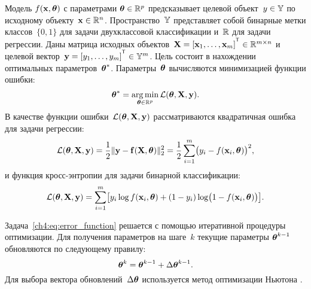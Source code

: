 \documentclass[11pt, a5paper]{dissert}
\begin{document}
Модель $f( \mathbf{x}, \boldsymbol{\theta})$ с параметрами $\boldsymbol{\theta} \in \mathbb{R}^p$ предсказывает целевой объект~$y \in \mathbb{Y}$ по исходному объекту~$\mathbf{x} \in \mathbb{R}^{n}$. Пространство~$\mathbb{Y}$ представляет собой бинарные метки классов~$\{0, 1\}$ для задачи двухклассовой классификации и~$\mathbb{R}$ для задачи регрессии.
Даны матрица исходных объектов~$\bX = [\bx_1, \dots, \bx_m]^{\T} \in \bbR^{m \times n}$ и целевой вектор~$\by = [y_1, \dots, y_m]^{\T} \in \bbY^{m}$. 
Цель состоит в нахождении оптимальных параметров~$\boldsymbol{\theta}^*$.
Параметры~$\boldsymbol{\theta}$ вычисляются минимизацией функции ошибки:
\begin{equation}
	\boldsymbol{\theta}^* = \mathop{\arg \min}\limits_{\boldsymbol{\theta} \in \mathbb{R}^p} \mathcal{L}(\boldsymbol{\theta}, \mathbf{X}, \mathbf{y}).
	\label{ch4:eq:error_function}
\end{equation}
В качестве функции ошибки~$\mathcal{L} (\boldsymbol{\theta}, \mathbf{X}, \mathbf{y})$ рассматриваются квадратичная ошибка для задачи регрессии:
\begin{equation}
	\mathcal{L}(\boldsymbol{\theta}, \mathbf{X}, \mathbf{y}) = \frac 12 \| \mathbf{y} - \mathbf{f}(\mathbf{X}, \boldsymbol{\theta}) \|_2^2 = \frac 12 \sum_{i=1}^m \bigl( y_i - f(\mathbf{x}_i,  \boldsymbol{\theta})\bigr)^2,
	\label{ch4:eq:squared_error}
\end{equation}
и функция кросс-энтропии для задачи бинарной классификации: 
\begin{equation}
	\mathcal{L}(\boldsymbol{\theta}, \mathbf{X}, \mathbf{y}) = \sum_{i=1}^m \bigl[y_i \log f (\mathbf{x}_i , \boldsymbol{\theta}) + (1-y_i) \log \bigl(1 - f (\mathbf{x}_i , \boldsymbol{\theta})\bigr)\bigr].
	\label{ch4:eq:log_loss}
\end{equation}

Задача~\eqref{ch4:eq:error_function} решается с помощью итеративной процедуры оптимизации. 
Для получения параметров на шаге~$k$ текущие параметры $\boldsymbol{\theta}^{k-1}$ обновляются по следующему правилу:
\begin{equation}
	\boldsymbol{\theta}^k = \boldsymbol{\theta}^{k - 1} + \Delta \boldsymbol{\theta}^{k - 1}.
	\label{ch4:eq:update_rule}
\end{equation}
Для выбора вектора обновлений~$\Delta \boldsymbol{\theta}$ используется метод оптимизации Ньютона .
\end{document}
